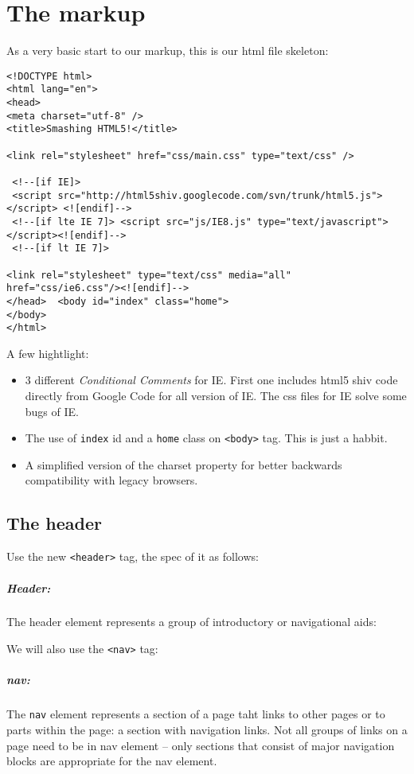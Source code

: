 \documentclass[a4paper, 12pt]{book}
\begin{document}
\chapter{The markup}
As a very basic start to our markup, this is our html file skeleton:
\begin{verbatim}
<!DOCTYPE html> 
<html lang="en"> 
<head> 
<meta charset="utf-8" /> 
<title>Smashing HTML5!</title>

<link rel="stylesheet" href="css/main.css" type="text/css" /> 

 <!--[if IE]>
 <script src="http://html5shiv.googlecode.com/svn/trunk/html5.js"></script> <![endif]-->
 <!--[if lte IE 7]> <script src="js/IE8.js" type="text/javascript"></script><![endif]-->
 <!--[if lt IE 7]>

<link rel="stylesheet" type="text/css" media="all" href="css/ie6.css"/><![endif]-->
</head>  <body id="index" class="home"> 
</body> 
</html>

\end{verbatim}
A few hightlight:
\begin{itemize}
\item 3 different \emph{Conditional Comments} for IE. First one includes html5
shiv code directly from Google Code for all version of IE. The css files for IE
solve some bugs of IE.
\item The use of \verb|index| id and a \verb|home| class on \verb|<body>| tag.
This is just a habbit.
\item A simplified version of the charset property for better backwards
compatibility with legacy browsers.
\end{itemize}
\section{The header}
Use the new \verb|<header>| tag, the spec of it as follows:
\paragraph{Header:} The header element represents a group of introductory or
navigational aids:

We will also use the \verb|<nav>| tag:
\paragraph{nav:} The \verb|nav| element represents a section of a page taht
links to other pages or to parts within the page: a section with navigation
links. Not all groups of links on a page need to be in nav element -- only
sections that consist of major navigation blocks are appropriate for the nav
element.
\end{document}
